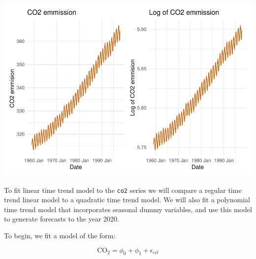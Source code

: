 \documentclass[AER]{AEA}
\begin{document}
\includegraphics{Lab2_Group_report_files/figure-latex/unnamed-chunk-4-1.pdf}

To fit linear time trend model to the \texttt{co2} series we will
compare a regular time trend linear model to a quadratic time trend
model. We will also fit a polynomial time trend model that incorporates
seasonal dummy variables, and use this model to generate forecasts to
the year 2020.

To begin, we fit a model of the form:

\begin{equation}
\label{eq:one}
\text{CO}_{2} = \phi_{0} + \phi_{1} + \epsilon_{eit}
\end{equation}
\end{document}
